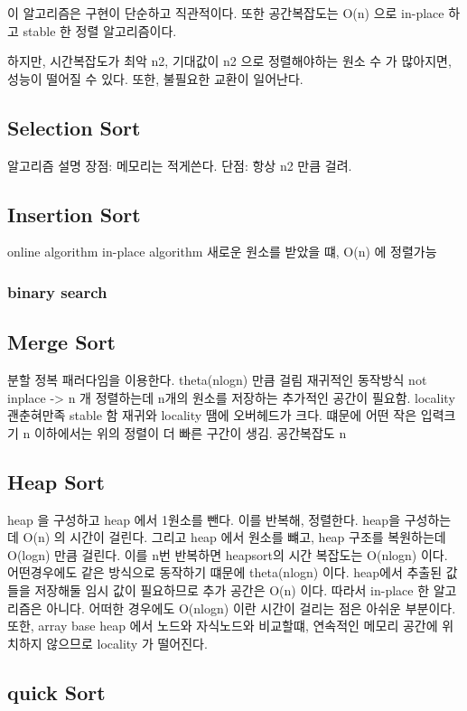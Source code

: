 \documentclass[sigconf]{acmart}
\begin{document}
이 알고리즘은 구현이 단순하고 직관적이다. 또한 공간복잡도는 O(n) 으로 in-place 하고 stable 한 정렬 알고리즘이다.

하지만, 시간복잡도가 최악 n2, 기대값이 n2 으로 정렬해야하는 원소 수 가 많아지면, 성능이 떨어질 수 있다. 또한, 불필요한 교환이 일어난다.
\subsection{Selection Sort}
알고리즘 설명
장점: 메모리는 적게쓴다.
단점: 항상 n2 만큼 걸려.

\subsection{Insertion Sort}
online algorithm
in-place algorithm
새로운 원소를 받았을 떄, O(n) 에 정렬가능

\subsubsection{binary search}
\subsection{Merge Sort}
분할 정복 패러다임을 이용한다. theta(nlogn) 만큼 걸림
재귀적인 동작방식
not inplace -> n 개 정렬하는데 n개의 원소를 저장하는 추가적인 공간이 필요함.
locality 괜춘혀만족
stable 함
재귀와 locality 땜에 오버헤드가 크다. 떄문에 어떤 작은 입력크기 n 이하에서는 위의 정렬이 더 빠른 구간이 생김.
공간복잡도 n




\subsection{Heap Sort}
heap 을 구성하고 heap 에서 1원소를 뺀다. 이를 반복해, 정렬한다. heap을 구성하는데 O(n) 의 시간이 걸린다. 그리고 heap 에서 원소를 뺴고, heap 구조를 복원하는데 O(logn) 만큼 걸린다. 이를 n번 반복하면 heapsort의 시간 복잡도는 O(nlogn) 이다. 어떤경우에도 같은 방식으로 동작하기 떄문에 theta(nlogn) 이다.
heap에서 추출된 값들을 저장해둘 임시 값이 필요하므로 추가 공간은 O(n) 이다. 따라서 in-place 한 알고리즘은 아니다.
어떠한 경우에도 O(nlogn) 이란 시간이 걸리는 점은 아쉬운 부분이다. 또한, array base heap 에서 노드와 자식노드와 비교할떄, 연속적인 메모리 공간에 위치하지 않으므로 locality 가 떨어진다.

\subsection{quick Sort}
\end{document}
